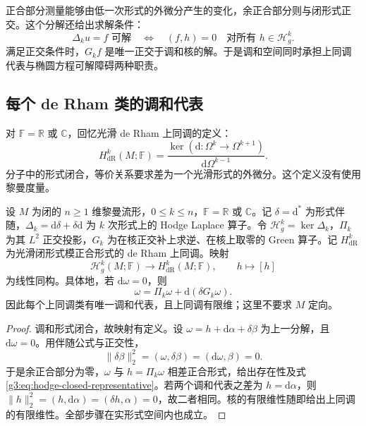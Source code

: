 正合部分测量能够由低一次形式的外微分产生的变化，余正合部分则与闭形式正交。这个分解还给出求解条件：
\[
	\Delta_k u=f\text{ 可解}
	\quad\Longleftrightarrow\quad
	(f,h)=0\quad\text{对所有 }h\in\mathcal H_g^k.
\]
满足正交条件时，\(G_kf\) 是唯一正交于调和核的解。于是调和空间同时承担上同调代表与椭圆方程可解障碍两种职责。

\subsection{每个 de Rham 类的调和代表}
\label{g3:subsec:1502:02}
对 \(\mathbb F=\mathbb R\) 或 \(\mathbb C\)，回忆光滑 de Rham 上同调的定义：
\[
	H_{\mathrm{dR}}^k(M;\mathbb F)
	=\frac{\ker(\mathrm d:\Omega^k\to\Omega^{k+1})}
	{\mathrm d\Omega^{k-1}}.
\]
分子中的形式闭合，等价关系要求差为一个光滑形式的外微分。这个定义没有使用黎曼度量。

\begin{theorem}[Hodge 定理]\label{g3:thm:hodge-de-rham}
	设 \(M\) 为闭的 \(n\ge1\) 维黎曼流形，\(0\le k\le n\)，\(\mathbb F=\mathbb R\) 或 \(\mathbb C\)。记 \(\delta=\mathrm d^*\) 为形式伴随，\(\Delta_k=\mathrm d\delta+\delta\mathrm d\) 为 \(k\) 次形式上的 Hodge Laplace 算子。令 \(\mathcal H_g^k=\ker\Delta_k\)，\(\Pi_k\) 为其 \(L^2\) 正交投影，\(G_k\) 为在核正交补上求逆、在核上取零的 Green 算子。记 \(H_{\mathrm{dR}}^k\) 为光滑闭形式模正合形式的 de Rham 上同调。映射
	\[
		\mathcal H_g^k(M;\mathbb F)\longrightarrow
		H_{\mathrm{dR}}^k(M;\mathbb F),\qquad h\longmapsto[h]
	\]
	为线性同构。具体地，若 \(\mathrm d\omega=0\)，则
	\begin{equation}\label{g3:eq:hodge-closed-representative}
		\omega=\Pi_k\omega+\mathrm d(\delta G_k\omega).
	\end{equation}
	因此每个上同调类有唯一调和代表，且上同调有限维；这里不要求 \(M\) 定向。
\end{theorem}
\begin{proof}
	调和形式闭合，故映射有定义。设 \(\omega=h+\mathrm d\alpha+\delta\beta\) 为上一分解，且 \(\mathrm d\omega=0\)。用伴随公式与正交性，
	\[
		\|\delta\beta\|_2^2
		=(\omega,\delta\beta)=(\mathrm d\omega,\beta)=0.
	\]
	于是余正合部分为零，\(\omega\) 与 \(h=\Pi_k\omega\) 相差正合形式，给出存在性及式\eqref{g3:eq:hodge-closed-representative}。若两个调和代表之差为 \(h=\mathrm d\alpha\)，则
	\(\|h\|_2^2=(h,\mathrm d\alpha)=(\delta h,\alpha)=0\)，故二者相同。核的有限维性随即给出上同调的有限维性。全部步骤在实形式空间内也成立。
\end{proof}

